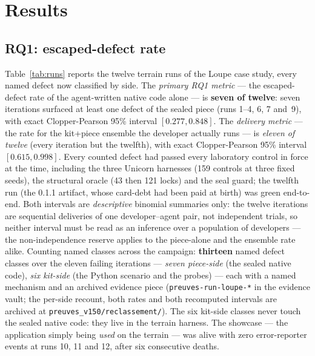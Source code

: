\documentclass[11pt,a4paper]{article}
\newcommand{\code}[1]{\texttt{\small #1}}
\begin{document}


\section{Results}\label{sec:results}

\subsection{RQ1: escaped-defect rate}\label{sec:rq1}

Table~\ref{tab:runs} reports the twelve terrain runs of the Loupe case
study, every named defect now classified by side. The \emph{primary RQ1
metric} --- the escaped-defect rate of the agent-written native code
alone --- is \textbf{seven of twelve}: seven iterations surfaced at
least one defect of the sealed piece (runs 1--4, 6, 7 and~9), with
exact Clopper-Pearson 95\% interval $[0.277, 0.848]$. The
\emph{delivery metric} --- the rate for the kit+piece ensemble the
developer actually runs --- is \emph{eleven of twelve} (every iteration
but the twelfth), with exact Clopper-Pearson 95\% interval
$[0.615, 0.998]$. Every counted defect had passed every laboratory
control in force at the time, including the three Unicorn harnesses
(159 controls at three fixed seeds), the structural oracle (43 then 121
locks) and the seal guard; the twelfth run (the 0.1.1 artifact, whose
card-debt had been paid at birth) was green end-to-end. Both intervals
are \emph{descriptive} binomial summaries only: the twelve iterations
are sequential deliveries of one developer--agent pair, not independent
trials, so neither interval must be read as an inference over a
population of developers --- the non-independence reserve applies to
the piece-alone and the ensemble rate alike. Counting named classes
across the campaign: \textbf{thirteen} named defect classes over the
eleven failing iterations --- \emph{seven piece-side} (the sealed
native code), \emph{six kit-side} (the Python scenario and the probes)
--- each with a named mechanism and an archived evidence piece
(\code{preuves-run-loupe-*} in the evidence vault; the per-side
recount, both rates and both recomputed intervals are archived at
\code{preuves\_v150/reclassement/}). The six kit-side classes never
touch the sealed native code: they live in the terrain harness. The
showcase --- the application simply being \emph{used} on the terrain
--- was alive with zero error-reporter events at runs 10, 11 and 12,
after six consecutive deaths.
\end{document}
